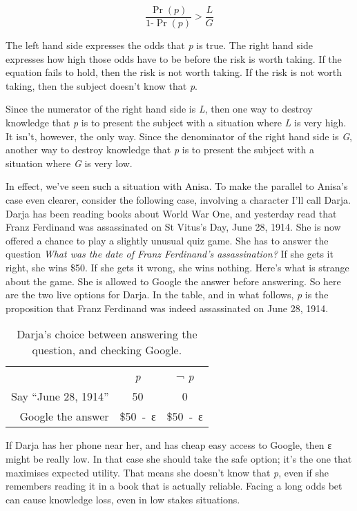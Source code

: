 \documentclass[
  10pt,
  letterpaper,
  twoside]{scrbook}
\begin{document}
\[
\frac{\Pr(\textit{p})}{1 ‑ \Pr(\textit{p})} > \frac{\textit{L}}{\textit{G}}
\]

The left hand side expresses the odds that \emph{p} is true. The right
hand side expresses how high those odds have to be before the risk is
worth taking. If the equation fails to hold, then the risk is not worth
taking. If the risk is not worth taking, then the subject doesn't know
that \emph{p}.

Since the numerator of the right hand side is \emph{L}, then one way to
destroy knowledge that \emph{p} is to present the subject with a
situation where \emph{L} is very high. It isn't, however, the only way.
Since the denominator of the right hand side is \emph{G}, another way to
destroy knowledge that \emph{p} is to present the subject with a
situation where \emph{G} is very low.

In effect, we've seen such a situation with Anisa. To make the parallel
to Anisa's case even clearer, consider the following case, involving a
character I'll call Darja. Darja has been reading books about World War
One, and yesterday read that Franz Ferdinand was assassinated on St
Vitus's Day, June 28, 1914. She is now offered a chance to play a
slightly unusual quiz game. She has to answer the question \emph{What
was the date of Franz Ferdinand's assassination?} If she gets it right,
she wins \$50. If she gets it wrong, she wins nothing. Here's what is
strange about the game. She is allowed to Google the answer before
answering. So here are the two live options for Darja. In the table, and
in what follows, \emph{p} is the proposition that Franz Ferdinand was
indeed assassinated on June 28, 1914.

\begin{longtable}[]{@{}rcc@{}}
\caption{Darja's choice between answering the question, and checking
Google.}\label{tbl-google}\tabularnewline
\toprule\noalign{}
\endfirsthead
\endhead
\bottomrule\noalign{}
\endlastfoot
~ & \emph{p} & ¬ \emph{p} \\
Say ``June 28, 1914'' & 50 & 0 \\
Google the answer & \$50~‑~ε & \$50~‑~ε \\
\end{longtable}

If Darja has her phone near her, and has cheap easy access to Google,
then ε might be really low. In that case she should take the safe
option; it's the one that maximises expected utility. That means she
doesn't know that \emph{p}, even if she remembers reading it in a book
that is actually reliable. Facing a long odds bet can cause knowledge
loss, even in low stakes situations.
\end{document}
